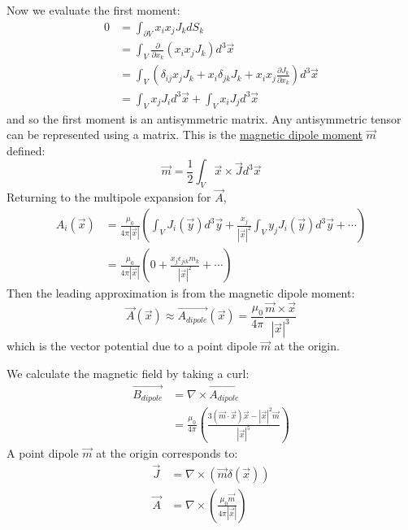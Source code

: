 \documentclass[../Main.tex]{subfiles}
\begin{document}
Now we evaluate the first moment:
\begin{align*}
    0 &= \int_{\partial V} x_i x_j J_k dS_k \\
    &= \int_V \frac{\partial}{\partial x_k} \left(x_i x_j J_k\right) d^3 \vec{x} \\
    &= \int_V \left(\delta_{ij} x_j J_k + x_i \delta_{jk} J_k + x_i x_j \frac{\partial J_k}{\partial x_k}\right) d^3 \vec{x} \\
    &= \int_V x_j J_i d^3\vec{x} + \int_V x_i J_j d^3\vec{x}
\end{align*}
and so the first moment is an antisymmetric matrix. Any antisymmetric tensor can be represented using a matrix. This is the \underline{magnetic dipole moment} $\vec{m}$ defined:
\begin{equation*}
    \vec{m} = \frac12 \int_V \vec{x} \times \vec{J} d^3\vec{x}
\end{equation*}
Returning to the multipole expansion for $\vec{A}$,
\begin{align*}
    A_i(\vec{x}) &= \frac{\mu_0}{4\pi |\vec{x}|} \left(\int_V J_i(\vec{y}) d^3 \vec{y} + \frac{x_j}{|\vec{x}|^2} \int_V y_j J_i(\vec{y}) d^3\vec{y} + \cdots\right) \\
    &= \frac{\mu_0}{4\pi |\vec{x}|} \left(0 + \frac{x_j \epsilon_{jik} m_k}{|\vec{x}|^2} + \cdots\right)
\end{align*}
Then the leading approximation is from the magnetic dipole moment:
\begin{equation*}
    \vec{A}(\vec{x}) \approx \vec{A_{dipole}}(\vec{x}) = \frac{\mu_0}{4\pi} \frac{\vec{m} \times \vec{x}}{|\vec{x}|^3}
\end{equation*}
which is the vector potential due to a point dipole $\vec{m}$ at the origin.

We calculate the magnetic field by taking a curl:
\begin{align*}
    \vec{B_{dipole}} &= \nabla \times \vec{A_{dipole}}\\
    &= \frac{\mu_0}{4\pi} \left(\frac{3(\vec{m} \cdot \vec{x}) \vec{x} - |\vec{x}|^2 \vec{m}}{|\vec{x}|^5}\right)
\end{align*}
A point dipole $\vec{m}$ at the origin corresponds to:
\begin{align*}
    \vec{J} &= \nabla \times \left(\vec{m} \delta(\vec{x})\right) \\
    \vec{A} &= \nabla \times \left(\frac{\mu_0 \vec{m}}{4\pi |\vec{x}|}\right)
\end{align*}
\end{document}
